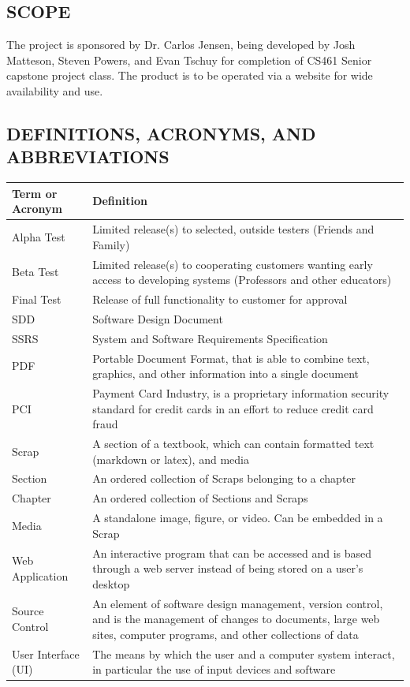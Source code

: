 \documentclass[onecolumn, draftclsnofoot,10pt, compsoc]{IEEEtran}
\begin{document}
\subsection[SCOPE]{SCOPE}

{\noindent
The project is sponsored by Dr. Carlos Jensen, being developed by Josh Matteson,
Steven Powers, and Evan Tschuy for completion of CS461 Senior capstone project class.
The product is to be operated via a website for wide availability and use.}

\subsection[DEFINITIONS, ACRONYMS, AND ABBREVIATIONS]{DEFINITIONS, ACRONYMS, AND ABBREVIATIONS}

\bigskip

\begin{center}

\tablehead{}
\begin{supertabular}{|p{3cm}|p{12cm}|}
\hline
Term or Acronym & Definition\\\hline
Alpha Test & Limited release(s) to selected, outside testers (Friends and Family)\\ \hline
Beta Test & Limited release(s) to cooperating customers wanting early access to developing systems (Professors
and other educators)\\ \hline
Final Test & Release of full functionality to customer for approval \\ \hline
SDD & Software Design Document \\ \hline
SSRS & System and Software Requirements Specification \\ \hline
PDF & Portable Document Format, that is able to combine text, graphics, and other information into a single document \\ \hline
PCI & Payment Card Industry, is a proprietary information security standard for credit cards in an effort to reduce credit card fraud \\ \hline
Scrap & A section of a textbook, which can contain formatted text (markdown or latex), and media \\ \hline
Section & An ordered collection of Scraps belonging to a chapter\\ \hline
Chapter & An ordered collection of Sections and Scraps\\ \hline
Media & A standalone image, figure, or video. Can be embedded in a Scrap\\ \hline
Web Application & An interactive program that can be accessed and is based through a web server instead of
being stored on a user's desktop\\ \hline
Source Control & An element of software design management, version control, and is the
management of changes to documents, large web sites, computer programs, and other
collections of data \\ \hline
User Interface (UI)  & The means by which the user and a computer system interact, in particular the use of
input devices and software\\ \hline
\end{supertabular}

\end{center}
\end{document}
